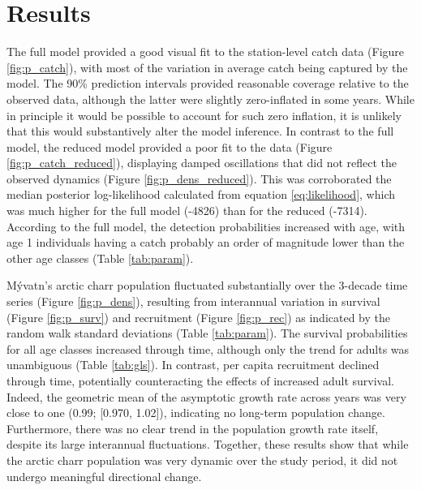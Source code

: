 \section*{Results}

The full model provided a good visual fit to the station-level 
catch data (Figure \ref{fig:p_catch}),
with most of the variation in average catch being captured by the model.
The 90\% prediction intervals provided reasonable coverage relative to the observed data,
although the latter were slightly zero-inflated in some years.
While in principle it would be possible to account for such zero inflation,
it is unlikely that this would substantively alter the model inference.
In contrast to the full model,
the reduced model provided a poor fit to the data (Figure \ref{fig:p_catch_reduced}),
displaying damped oscillations that did not reflect the observed dynamics
(Figure \ref{fig:p_dens_reduced}).
This was corroborated the median posterior log-likelihood calculated
from equation \ref{eq:likelihood},
which was much higher for the full model (-4826) than for the reduced (-7314).
According to the full model, 
the detection probabilities increased with age,
with age 1 individuals having a catch probably an order of magnitude lower
than the other age classes (Table \ref{tab:param}).


M\'{y}vatn's arctic charr population fluctuated substantially over the 3-decade time series
(Figure \ref{fig:p_dens}), 
resulting from interannual variation in survival (Figure \ref{fig:p_surv}) 
and recruitment (Figure \ref{fig:p_rec}) 
as indicated by the random walk standard deviations (Table \ref{tab:param}).
The survival probabilities for all age classes increased through time,
although only the trend for adults was unambiguous (Table \ref{tab:gls}). 
In contrast, per capita recruitment declined through time, 
potentially counteracting the effects of increased adult survival.
Indeed, the geometric mean of the asymptotic growth rate across years was very close to one
(0.99; [0.970, 1.02]), indicating no long-term population change.
Furthermore, there was no clear trend in the population growth rate itself,
despite its large interannual fluctuations.
Together, these results show that while the arctic charr population was very dynamic
over the study period, it did not undergo meaningful directional change.

